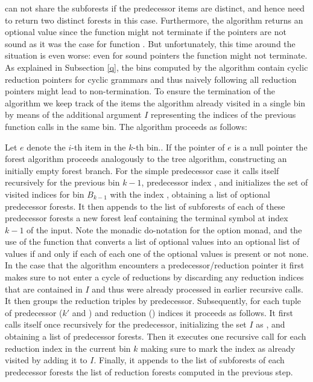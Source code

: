 \begin{isabellebody}
\begin{isamarkuptext}
can not share the subforests if the predecessor items are distinct, and hence need to return two distinct forests in this case. Furthermore, the algorithm returns an
optional value since the function might not terminate if the pointers are not sound as it was the case
for function . But unfortunately, this time around the situation is even worse:
even for sound pointers the function  might not terminate.
As explained in Subsection \ref{q}, the bins computed by the algorithm  contain
cyclic reduction pointers for cyclic grammars and thus naively following all reduction pointers might lead
to non-termination. To ensure the termination of the algorithm we keep track of the items the algorithm
already visited in a single bin by means of the additional argument $I$ representing the indices
of the previous function calls in the same bin. The algorithm proceeds as follows:

Let $e$ denote the $i$-th item in the $k$-th bin.. If the pointer of $e$ is
a null pointer the forest algorithm proceeds analogously to the tree algorithm, constructing an initially
empty forest branch. For the simple predecessor case it calls itself recursively for the previous bin
$k-1$, predecessor index , and initializes the set of visited indices for bin $B_{k-1}$ with
the index , obtaining a list of optional predecessor forests. It then appends
to the list of subforests of each of these predecessor forests a new forest leaf containing the terminal symbol at
index $k-1$ of the input. Note the monadic do-notation for the option monad, and the use
of the function  that converts a list of optional values into an optional list of values
if and only if each of each one of the optional values is present or not none. In the case that the algorithm
encounters a predecessor/reduction pointer it first makes sure to not enter a cycle of reductions
by discarding any reduction indices that are contained in $I$ and thus were already processed in earlier
recursive calls. It then groups the reduction triples by predecessor. Subsequently, for each tuple of predecessor
($k'$ and ) and reduction () indices it proceeds as follows. It first calls itself once recursively
for the predecessor, initializing the set $I$ as , and obtaining a list of predecessor
forests. Then it executes one recursive call for each reduction index 
in the current bin $k$ making sure to mark the index  as already visited by adding it to $I$.
Finally, it appends to the list of subforests of each predecessor forests the list of reduction forests
computed in the previous step.


\end{isamarkuptext}
\end{isabellebody}

